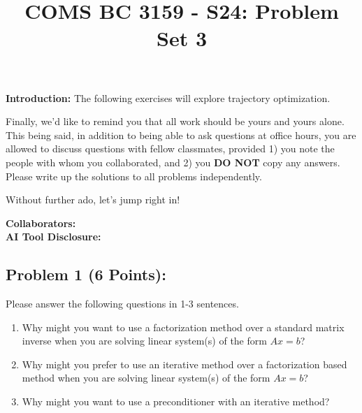 \documentclass[]{article}
\title{COMS BC 3159 - S24: Problem Set 3}
\author{
}
\date{}
\begin{document}
\maketitle

\textbf{Introduction:}  
The following exercises will explore trajectory optimization.

Finally, we'd like to remind you that all work should be yours and yours alone. This being said, in addition to being able to ask questions at office hours, you are allowed to discuss questions with fellow classmates, provided 1) you note the people with whom you collaborated, and 2) you \textbf{DO NOT} copy any answers. Please write up the solutions to all problems independently.

Without further ado, let's jump right in!

\bigskip
\textbf{Collaborators:}
\\
\textbf{AI Tool Disclosure:}
\clearpage

\subsection*{Problem 1 (6 Points):}
Please answer the following questions in 1-3 sentences.
\begin{enumerate}[label=(\alph*)]
    \item Why might you want to use a factorization method over a standard matrix inverse when you are solving linear system(s) of the form $Ax=b$?
    \item Why might you prefer to use an iterative method over a factorization based method when you are solving linear system(s) of the form $Ax=b$?
    \item Why might you want to use a preconditioner with an iterative method?
\end{enumerate}
\end{document}
